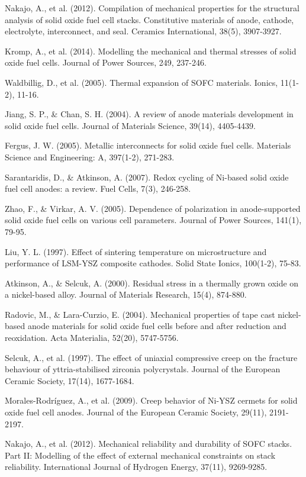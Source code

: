 \documentclass[10pt,conference]{IEEEtran}
\begin{document}
\begin{thebibliography}{99}
 Nakajo, A., et al. (2012). Compilation of mechanical properties for the structural analysis of solid oxide fuel cell stacks. Constitutive materials of anode, cathode, electrolyte, interconnect, and seal. Ceramics International, 38(5), 3907-3927.

 Kromp, A., et al. (2014). Modelling the mechanical and thermal stresses of solid oxide fuel cells. Journal of Power Sources, 249, 237-246.

 Waldbillig, D., et al. (2005). Thermal expansion of SOFC materials. Ionics, 11(1-2), 11-16.

 Jiang, S. P., \& Chan, S. H. (2004). A review of anode materials development in solid oxide fuel cells. Journal of Materials Science, 39(14), 4405-4439.

 Fergus, J. W. (2005). Metallic interconnects for solid oxide fuel cells. Materials Science and Engineering: A, 397(1-2), 271-283.

 Sarantaridis, D., \& Atkinson, A. (2007). Redox cycling of Ni-based solid oxide fuel cell anodes: a review. Fuel Cells, 7(3), 246-258.

 Zhao, F., \& Virkar, A. V. (2005). Dependence of polarization in anode-supported solid oxide fuel cells on various cell parameters. Journal of Power Sources, 141(1), 79-95.

 Liu, Y. L. (1997). Effect of sintering temperature on microstructure and performance of LSM-YSZ composite cathodes. Solid State Ionics, 100(1-2), 75-83.

 Atkinson, A., \& Selcuk, A. (2000). Residual stress in a thermally grown oxide on a nickel-based alloy. Journal of Materials Research, 15(4), 874-880.

 Radovic, M., \& Lara-Curzio, E. (2004). Mechanical properties of tape cast nickel-based anode materials for solid oxide fuel cells before and after reduction and reoxidation. Acta Materialia, 52(20), 5747-5756.

 Selcuk, A., et al. (1997). The effect of uniaxial compressive creep on the fracture behaviour of yttria-stabilised zirconia polycrystals. Journal of the European Ceramic Society, 17(14), 1677-1684.

 Morales-Rodríguez, A., et al. (2009). Creep behavior of Ni-YSZ cermets for solid oxide fuel cell anodes. Journal of the European Ceramic Society, 29(11), 2191-2197.

 Nakajo, A., et al. (2012). Mechanical reliability and durability of SOFC stacks. Part II: Modelling of the effect of external mechanical constraints on stack reliability. International Journal of Hydrogen Energy, 37(11), 9269-9285.


\end{thebibliography}
\end{document}
